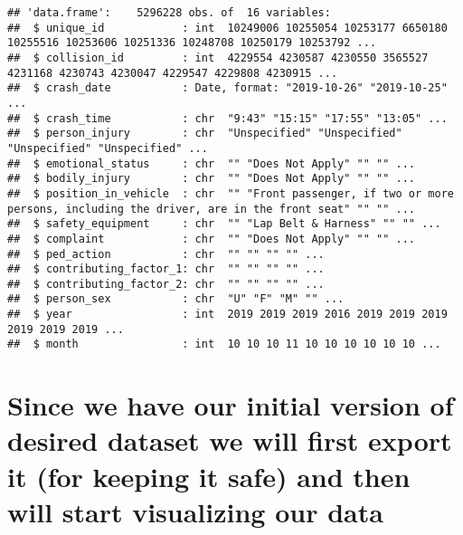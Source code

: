 \documentclass[
]{article}
\newenvironment{Shaded}{\begin{snugshade}}{\end{snugshade}}
\newcommand{\CommentTok}[1]{\textcolor[rgb]{0.56,0.35,0.01}{\textit{#1}}}
\newcommand{\FunctionTok}[1]{\textcolor[rgb]{0.13,0.29,0.53}{\textbf{#1}}}
\newcommand{\NormalTok}[1]{#1}
\newcommand{\OtherTok}[1]{\textcolor[rgb]{0.56,0.35,0.01}{#1}}
\newcommand{\SpecialCharTok}[1]{\textcolor[rgb]{0.81,0.36,0.00}{\textbf{#1}}}
\begin{document}
\begin{Shaded}
\end{Shaded}

\begin{verbatim}
## 'data.frame':    5296228 obs. of  16 variables:
##  $ unique_id            : int  10249006 10255054 10253177 6650180 10255516 10253606 10251336 10248708 10250179 10253792 ...
##  $ collision_id         : int  4229554 4230587 4230550 3565527 4231168 4230743 4230047 4229547 4229808 4230915 ...
##  $ crash_date           : Date, format: "2019-10-26" "2019-10-25" ...
##  $ crash_time           : chr  "9:43" "15:15" "17:55" "13:05" ...
##  $ person_injury        : chr  "Unspecified" "Unspecified" "Unspecified" "Unspecified" ...
##  $ emotional_status     : chr  "" "Does Not Apply" "" "" ...
##  $ bodily_injury        : chr  "" "Does Not Apply" "" "" ...
##  $ position_in_vehicle  : chr  "" "Front passenger, if two or more persons, including the driver, are in the front seat" "" "" ...
##  $ safety_equipment     : chr  "" "Lap Belt & Harness" "" "" ...
##  $ complaint            : chr  "" "Does Not Apply" "" "" ...
##  $ ped_action           : chr  "" "" "" "" ...
##  $ contributing_factor_1: chr  "" "" "" "" ...
##  $ contributing_factor_2: chr  "" "" "" "" ...
##  $ person_sex           : chr  "U" "F" "M" "" ...
##  $ year                 : int  2019 2019 2019 2016 2019 2019 2019 2019 2019 2019 ...
##  $ month                : int  10 10 10 11 10 10 10 10 10 10 ...
\end{verbatim}

\hypertarget{since-we-have-our-initial-version-of-desired-dataset-we-will-first-export-it-for-keeping-it-safe-and-then-will-start-visualizing-our-data}{%
\section{Since we have our initial version of desired dataset we will
first export it (for keeping it safe) and then will start visualizing
our
data}\label{since-we-have-our-initial-version-of-desired-dataset-we-will-first-export-it-for-keeping-it-safe-and-then-will-start-visualizing-our-data}}
\end{document}
